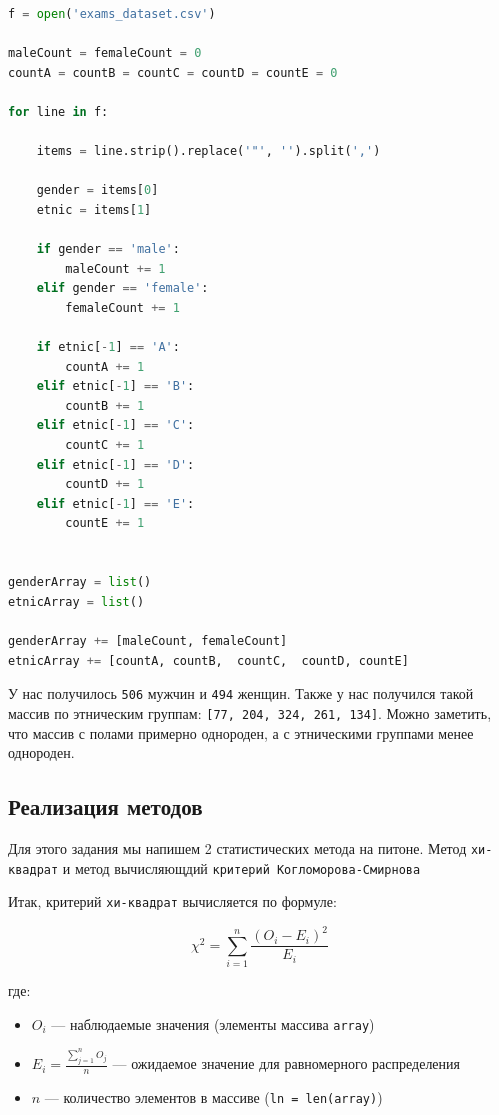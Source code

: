 \documentclass[14pt]{extreport}
\begin{document}
	
	\begin{lstlisting}[language=python, caption={Счет данных по выборкам}]
f = open('exams_dataset.csv')

maleCount = femaleCount = 0
countA = countB = countC = countD = countE = 0

for line in f:
	
	items = line.strip().replace('"', '').split(',')
	
	gender = items[0]
	etnic = items[1]
	
	if gender == 'male':
		maleCount += 1
	elif gender == 'female':
		femaleCount += 1
	
	if etnic[-1] == 'A':
		countA += 1
	elif etnic[-1] == 'B':
		countB += 1
	elif etnic[-1] == 'C':
		countC += 1
	elif etnic[-1] == 'D':
		countD += 1
	elif etnic[-1] == 'E':
		countE += 1


genderArray = list()
etnicArray = list()

genderArray += [maleCount, femaleCount]
etnicArray += [countA, countB,  countC,  countD, countE]
\end{lstlisting}
	
	
	У нас получилось \texttt{506} мужчин и \texttt{494} женщин. Также у нас получился такой массив по этническим группам: \texttt{[77, 204, 324, 261, 134]}. Можно заметить, что массив с полами примерно однороден, а с этническими группами менее однороден.
	
	\subsection{Реализация методов}	
	
	Для этого задания мы напишем 2 статистических метода на питоне. Метод \texttt{хи-квадрат} и метод вычисляющдий \texttt{критерий Когломорова-Смирнова}
	
	Итак, критерий \texttt{хи-квадрат} вычисляется по формуле:
	
	\[
		\chi^2 = \sum_{i=1}^{n} \frac{(O_i - E_i)^2}{E_i}
	\]
	
	где:
	\begin{itemize}
		\item $O_i$ --- наблюдаемые значения (элементы массива \texttt{array})
		\item $E_i = \frac{\sum_{j=1}^{n} O_j}{n}$ --- ожидаемое значение для равномерного распределения
		\item $n$ --- количество элементов в массиве (\texttt{ln = len(array)})
	\end{itemize}
	
\end{document}
